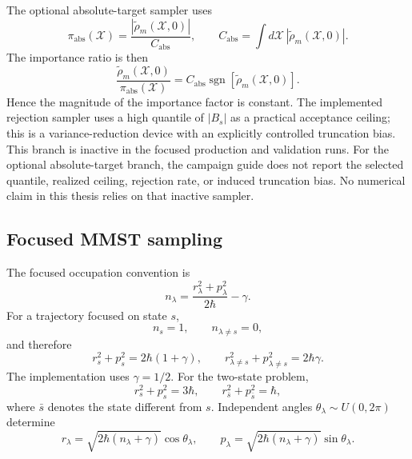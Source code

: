 \documentclass[
  11pt,
  letterpaper,
  onehalfspacing,
  normalmargins,
  equalmargins,
  oneside
]{ut-thesis}
\begin{document}
The optional absolute-target sampler uses
\begin{equation}
\pi_{\mathrm{abs}}(\boldsymbol{\mathcal X})
=
\frac{
|\tilde\rho_m(\boldsymbol{\mathcal X},0)|
}{
C_{\mathrm{abs}}
},
\qquad
C_{\mathrm{abs}}
=
\int
d\boldsymbol{\mathcal X}\,
|\tilde\rho_m(\boldsymbol{\mathcal X},0)|.
\label{appeq:absolute-target-proposal}
\end{equation}
The importance ratio is then
\begin{equation}
\frac{\tilde\rho_m(\boldsymbol{\mathcal X},0)}{\pi_{\mathrm{abs}}(\boldsymbol{\mathcal X})}
=
C_{\mathrm{abs}}
\operatorname{sgn}
\left[
\tilde\rho_m(\boldsymbol{\mathcal X},0)
\right].
\label{appeq:absolute-target-weight}
\end{equation}
Hence the magnitude of the importance factor is constant.  The implemented
rejection sampler uses a high quantile of \(|B_s|\) as a practical acceptance
ceiling; this is a variance-reduction device with an explicitly controlled
truncation bias.
This branch is inactive in the focused production and validation runs.
For the optional absolute-target branch, the campaign guide does not report
the selected quantile, realized ceiling, rejection rate, or induced truncation
bias. No numerical claim in this thesis relies on that inactive sampler.

\subsection{Focused MMST sampling}
\label{appsubsec:focused-sampling}

The focused occupation convention
\cite{StockThoss1997PRL,ThossStock1999PRA,Kelly2012JCP} is
\begin{equation}
n_\lambda
=
\frac{
r_\lambda^2+p_\lambda^2
}{
2\hbar
}
-\gamma.
\label{appeq:focused-occupation}
\end{equation}
For a trajectory focused on state \(s\),
\[
n_s=1,
\qquad
n_{\lambda\ne s}=0,
\]
and therefore
\begin{equation}
r_s^2+p_s^2
=
2\hbar(1+\gamma),
\qquad
r_{\lambda\ne s}^2+p_{\lambda\ne s}^2
=
2\hbar\gamma.
\label{appeq:focused-radii}
\end{equation}
The implementation uses \(\gamma=1/2\).  For the two-state problem,
\[
r_s^2+p_s^2=3\hbar,
\qquad
r_{\bar s}^2+p_{\bar s}^2=\hbar,
\]
where \(\bar s\) denotes the state different from \(s\).  Independent angles
\(\theta_\lambda\sim U(0,2\pi)\) determine
\begin{equation}
r_\lambda
=
\sqrt{2\hbar(n_\lambda+\gamma)}\cos\theta_\lambda,
\qquad
p_\lambda
=
\sqrt{2\hbar(n_\lambda+\gamma)}\sin\theta_\lambda.
\label{appeq:focused-angle-sampling}
\end{equation}
\end{document}
